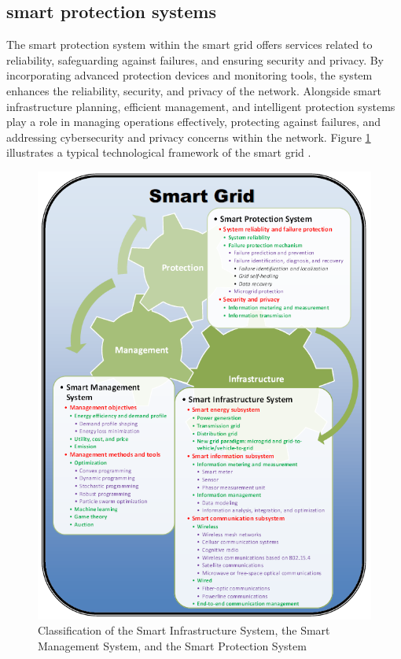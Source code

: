 \subsection{smart protection systems}
The smart protection system within the smart grid offers services related to reliability, safeguarding against failures, and ensuring security and privacy. By incorporating advanced protection devices and monitoring tools, the system enhances the reliability, security, and privacy of the network. Alongside smart infrastructure planning, efficient management, and intelligent protection systems play a role in managing operations effectively, protecting against failures, and addressing cybersecurity and privacy concerns within the network. Figure \ref{fig:Classification} illustrates a typical technological framework of the smart grid \cite{shafiullah2013smart}.
\begin{figure}[h]
	\centering
	\includegraphics[width=12cm]{figures/Classification.PNG}
	\caption{Classification of the Smart Infrastructure System, the Smart Management System, and the Smart Protection
	System \cite{fang2011smart}}
	\label{fig:Classification}
\end{figure}


